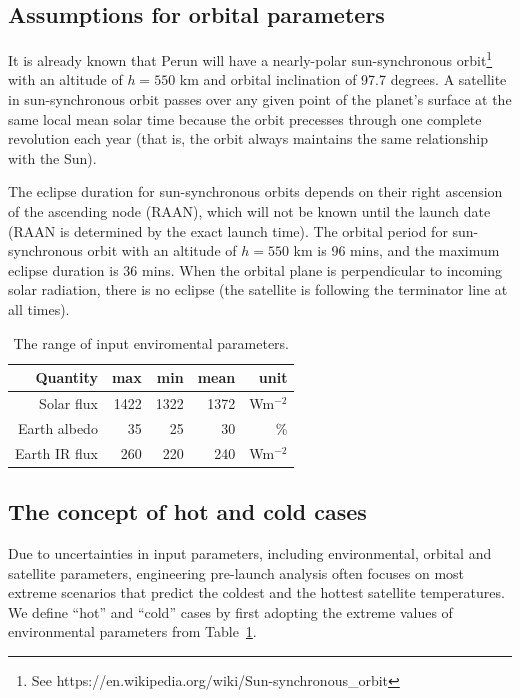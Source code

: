 \documentclass[]{aastex62}
\begin{document}
\subsection{Assumptions for orbital parameters}

It is already known that Perun will have a nearly-polar sun-synchronous 
orbit\footnote{See https://en.wikipedia.org/wiki/Sun-synchronous\_orbit} 
with an altitude of $h=550$ km and orbital inclination of 97.7 degrees. A satellite in sun-synchronous 
orbit passes over any given point of the planet's surface at the same local mean solar time because the 
orbit precesses through one complete revolution each year (that is, the orbit always maintains the same 
relationship with the Sun). 

The eclipse duration for sun-synchronous orbits depends on their right ascension of the 
ascending node (RAAN), which will not be known until the launch date (RAAN is determined
by the exact launch time). The orbital period for sun-synchronous orbit with an altitude of 
$h=550$ km is 96 mins, and the maximum eclipse duration is 36 mins.  When the orbital 
plane is perpendicular to incoming solar radiation, there is no eclipse (the satellite is following 
the terminator line at all times). 


\begin{table}[t]
	\centering
	\caption{The range of input enviromental parameters. }
	\label{tab:inputsEnvParam}
	\begin{tabular}{r|r|r|r|r} %
		\hline
  	         Quantity & max    &   min   &  mean &  unit            \\
		\hline
              Solar flux   &  1422  &  1322  &  1372 & Wm$^{-2}$  \\
           Earth albedo  &    35    &    25    &     30  &   \%            \\ 
            Earth IR flux &  260    &   220   &    240 & Wm$^{-2}$   \\
 		\hline
	\end{tabular} 
\end{table}


\subsection{The concept of hot and cold cases} 

Due to uncertainties in input parameters, including environmental, orbital and satellite parameters,
engineering pre-launch analysis often focuses on most extreme scenarios that predict the coldest 
and the hottest satellite temperatures. We define ``hot'' and ``cold'' cases by first adopting 
the extreme values of environmental parameters from Table~\ref{tab:inputsEnvParam}. 
\end{document}
